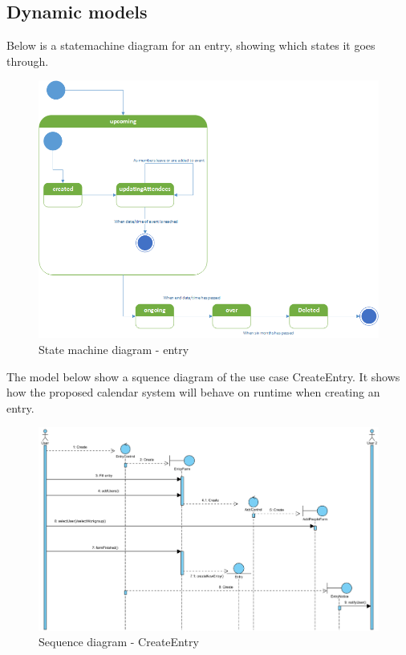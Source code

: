 \subsection{Dynamic models}
Below is a statemachine diagram for an entry, showing which states it goes through.
\begin{figure}[h]
\centering
\includegraphics[scale = 0.5]{statemachine}
\caption{State machine diagram - entry}
\end{figure}
\pagebreak
The model below show a squence diagram of the use case CreateEntry. It shows how the proposed calendar system will behave on runtime when creating an entry.
\begin{figure}[h]
\centering
\includegraphics[scale = 0.5]{sequenceDiagram2}
\caption{Sequence diagram - CreateEntry}
\end{figure}